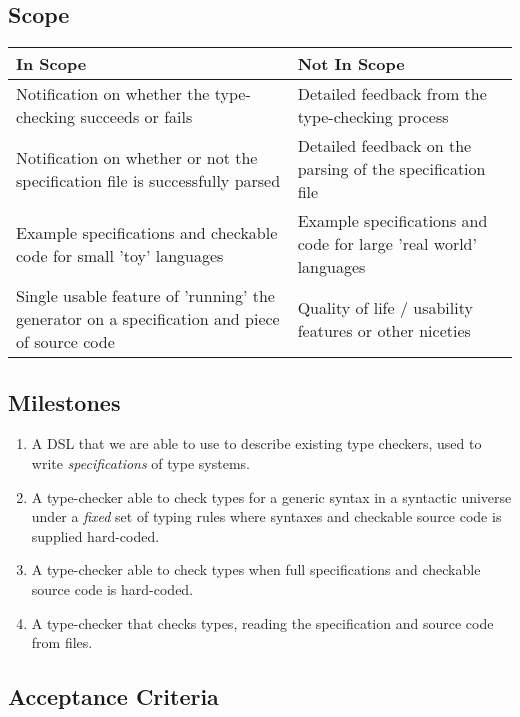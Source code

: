   \subsection{Scope}
  \label{sec-scope}

  \begin{center}
  \begin{tabular}{p{20em}|p{18em}}
    \large In Scope & \large Not In Scope \\ \hline \hline
    Notification on whether the type-checking succeeds
    or fails
    & Detailed feedback from the type-checking process \\ \hline
    Notification on whether or not the specification file is
    successfully parsed
    & Detailed feedback on the parsing of the specification file \\ \hline
    Example specifications and checkable code for small 'toy' languages
    & Example specifications and code for large 'real world' languages \\ \hline
    Single usable feature of 'running' the generator on a
    specification and piece of source code
    & Quality of life / usability features or other niceties \\ \hline
  \end{tabular}            
  \end{center}        
  
  \subsection{Milestones}
  \label{section-milestones}

  \begin{enumerate}
  \item A DSL that we are able to use to describe existing
    type checkers, used to write \emph{specifications} of type systems.
  \item A type-checker able to check types for a generic syntax
    in a syntactic universe under a \emph{fixed} set of typing rules
    where syntaxes and checkable source code is supplied hard-coded.
  \item A type-checker able to check types when full specifications
    and checkable source code is hard-coded.
  \item A type-checker  that checks types, reading
    the specification and source code from files.
  \end{enumerate}
  
  \subsection{Acceptance Criteria}
  \label{sec-acceptance}

